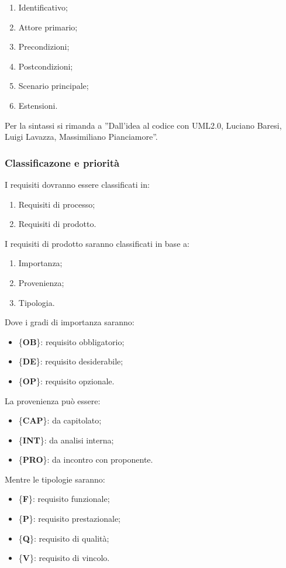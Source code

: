 {{{			\begin{enumerate}
				\item Identificativo;
				\item Attore primario;
				\item Precondizioni;
				\item Postcondizioni;
				\item Scenario principale;
				\item Estensioni.
			\end{enumerate}
			Per la sintassi si rimanda a ”Dall’idea al codice con UML2.0, Luciano Baresi, Luigi Lavazza, Massimiliano Pianciamore”.
			}
			\subsubsection{Classificazone e priorit\`{a}}{
				I requisiti dovranno essere classificati in:
				\begin{enumerate}
					\item Requisiti di processo;
					\item Requisiti di prodotto.
				\end{enumerate}
				I requisiti di prodotto saranno classificati in base a:
				\begin{enumerate}
					\item Importanza;
					\item Provenienza;
					\item Tipologia.
				\end{enumerate}
				Dove i gradi di importanza saranno:
				\begin{itemize}
						\item \{\textbf{OB}\}: requisito obbligatorio;
						\item \{\textbf{DE}\}: requisito desiderabile;
						\item \{\textbf{OP}\}: requisito opzionale.
				\end{itemize}
				La provenienza pu\`{o} essere:
				\begin{itemize}
					\item \{\textbf{CAP}\}: da capitolato;
					\item \{\textbf{INT}\}: da analisi interna;
					\item \{\textbf{PRO}\}: da incontro con proponente.
				\end{itemize}
				Mentre le tipologie saranno:
				\begin{itemize}
					\item \{\textbf{F}\}: requisito funzionale;
					\item \{\textbf{P}\}: requisito prestazionale;
					\item \{\textbf{Q}\}: requisito di qualit\`{a};
					\item \{\textbf{V}\}: requisito di vincolo.
				\end{itemize}
			}
}}
